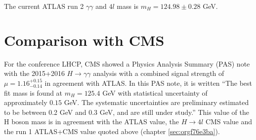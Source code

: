 The current ATLAS run 2 $\gamma\gamma$ and $4l$ mass \cite{ATLAS-CONF-2017-046} is $m_H=124.98\pm0.28$ GeV.

\section{Comparison with CMS}
\label{sec:org2d182d7}

For the conference LHCP, CMS showed a Physics Analysis Summary (PAS) note with the 2015+2016 $H\rightarrow\gamma\gamma$ analysis \cite{CMS-PAS-HIG-16-040} with a combined signal strength of $\mu=1.16^{+0.15}_{-0.14}$ in agreement with ATLAS.
In this PAS note, it is written
``The best fit mass is found at $m_H=125.4$ GeV with statistical uncertainty of approximately $0.15$ GeV.
The systematic uncertainties are preliminary estimated to be between 0.2 GeV and 0.3 GeV, and are still under study.''
This value of the H boson mass is in agreement with the ATLAS value, the $H\rightarrow 4l$ CMS value \cite{CMS-PAS-HIG-16-041,CMS-HIG-16-041} and the run 1 ATLAS+CMS value \cite{CERN-PH-EP-2015-075} quoted above (chapter \ref{sec:orgf76e3ba}).
